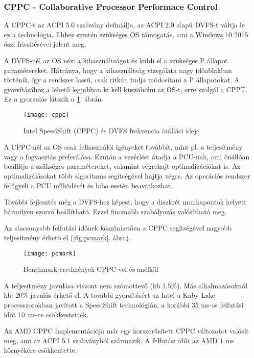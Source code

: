 \subsubsection{CPPC - Collaborative Processor Performace Control}
A CPPC-t az ACPI 5.0 szabvány definiálja, az ACPI 2.0 alapú DVFS-t váltja le ez a technológia.
Ehhez szintén szükséges OS támogatás, ami a Windows 10 2015 őszi frissítésével jelent meg.

A DVFS-nél az OS nézi a kihasználtságot és küldi el a szükséges P állapot paramétereket.
Hátránya, hogy a kihasználtság vizsgálata nagy időablakban történik, így a rendszer lassú, csak ritkán tudja módosítani a P állapotokat.
A gyorsításához a lehető legjobban ki kell küszöbölni az OS-t, erre szolgál a CPPT.
Ez a gyorsulás látszik a \ref{fig:cppc}. ábrán.
\begin{figure}[H]
    \texttt{[image: cppc]}
    \centering
    \caption{Intel SpeedShift (CPPC) és DVFS frekvencia átállási ideje}
    \label{fig:cppc}
\end{figure}

A CPPC-nél az OS csak felhasználói igényeket továbbít, mint pl. a teljesítmény vagy a fogyasztás preferálása.
Ezután a vezérlést átadja a PCU-nak, ami önállóan beállítja a szükséges paramétereket, valamint végrehajt optimalizációkat is.
Az optimalizálásokat több algoritmus segítségével hajtja végre.
Az operációs rendszer felügyeli a PCU működését és hiba esetén beavatkozhat.

További fejlesztés még a DVFS-hez képest, hogy a diszkrét munkapontok helyett bármilyen szorzó beállítható.
Ezzel finomabb szabályozás valósítható meg.

Az alacsonyabb felfutási időnek köszönhetően a CPPC segítségével nagyobb teljesítmény érhető el (\ref{fig:pcmark}. ábra).
\begin{figure}[H]
    \texttt{[image: pcmark]}
    \centering
    \caption{Benchmark eredmények CPPC-vel és anélkül}
    \label{fig:pcmakr}
\end{figure}
A teljesítmény javulása viszont nem számottevő (kb 1.5\%).
Más alkalmazásoknál kb. 20\% javulás érhető el.
A további gyorsításért az Intel a Kaby Lake processzorokban javított a SpeedShift technológián, a korábbi 35 ms-os felfutási időt 10 ms-re csökkentették.

Az AMD CPPC Implementációja már egy korszerűsített CPPC változatot valósít meg, ami az ACPI 5.1 szabványból származik.
A felfutási időt az AMD 1 ms környékére csökkentette.

